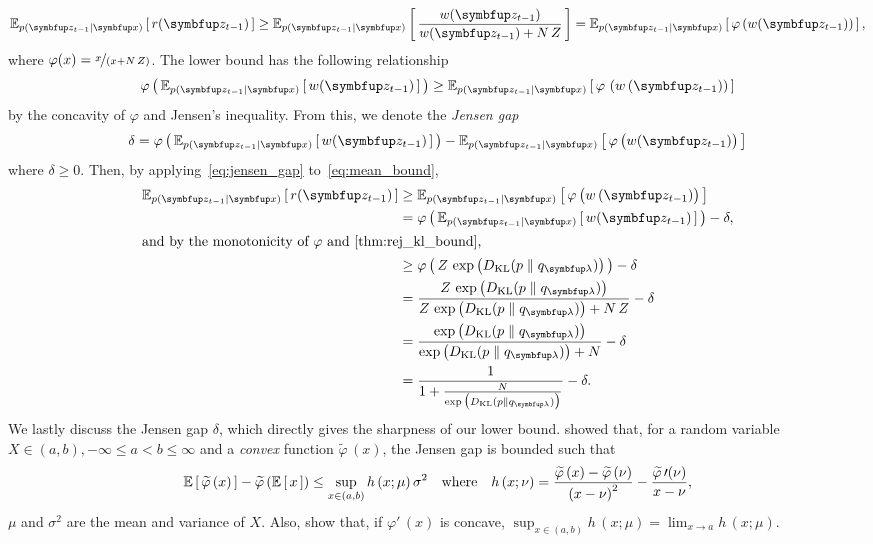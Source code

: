\begin{proofEnd}
\begin{equation}
    \Esub{p(\vz_{t-1}\mid\vx)}{ r(\vz_{t-1}) } \geq \Esub{p(\vz_{t-1}\mid\vx)}{ \frac{w(\vz_{t-1})}{w(\vz_{t-1}) + N\,Z}} =
    \Esub{p(\vz_{t-1}\mid\vx)}{ \varphi\left( w(\vz_{t-1}) \right)  },\label{eq:mean_bound}
  \end{equation}
  where \(\varphi(x) = \nicefrac{x}{(x + N\,Z)}\).
  The lower bound has the following relationship
  \begin{equation}
    \varphi\left(\,
    \Esub{p(\vz_{t-1}\mid\vx)}{ w(\vz_{t-1}) }
    \,\right)
    \geq
    \Esub{p(\vz_{t-1}\mid\vx)}{ \varphi\,\left( w\,(\vz_{t-1}) \right)  }
  \end{equation}
  by the concavity of \(\varphi\) and Jensen's inequality.
  From this, we denote the \textit{Jensen gap}
  \begin{equation}
    \delta = 
    \varphi\left(\,
    \Esub{p(\vz_{t-1}\mid\vx)}{ w(\vz_{t-1}) }
    \,\right)
    -
    \Esub{p(\vz_{t-1}\mid\vx)}{ \varphi\,\big( w(\vz_{t-1}) \big)  }\label{eq:jensen_gap}
  \end{equation}
  where \(\delta \geq 0\).
  Then, by applying~\eqref{eq:jensen_gap} to~\eqref{eq:mean_bound},
  \begin{align}
    \Esub{p(\vz_{t-1}\mid\vx)}{ r(\vz_{t-1}) }
    &\geq \Esub{p(\vz_{t-1}\mid\vx)}{ \varphi\,\big( w\,(\vz_{t-1}) \big)  } \\
    &= \varphi\left(\,
    \Esub{p(\vz_{t-1}\mid\vx)}{ w(\vz_{t-1}) }
    \,\right) - \delta, \\
\intertext{and by the monotonicity of \(\varphi\) and~\cref{thm:rej_kl_bound},}
    &\geq \varphi\left(\,
    Z\,\exp\big(\DKL{p}{q_{\vlambda}}\big)
    \,\right) - \delta \\
    &=
    \frac{
      Z\,\exp\big(\DKL{p}{q_{\vlambda}}\big)
    }{
      Z\,\exp\big(\DKL{p}{q_{\vlambda}}\big) + N\,Z
    } - \delta \\
    &= \frac{
      \exp\big(\DKL{p}{q_{\vlambda}}\big)
    }{
      \exp\big(\DKL{p}{q_{\vlambda}}\big) + N
    } - \delta \\
    &= \frac{1}{
       1 + \frac{N}{
         \exp\big(\DKL{p}{q_{\vlambda}}\big) 
      }
    } - \delta.
  \end{align}
  We lastly discuss the Jensen gap \(\delta\), which directly gives the sharpness of our lower bound.
  \citet[Theorem 1]{liao_sharpening_2019} showed that, for a random variable \(X \in (a, b), -\infty \leq a < b \leq \infty\) and a \textit{convex} function \(\widetilde{\varphi}\,(x)\), the Jensen gap is bounded such that
  \begin{align}
    \mathbb{E}\left[\,\widetilde{\varphi}\,(x)\,\right] - \widetilde{\varphi}\,(\mathbb{E}\left[\,x\,\right])
    \leq
    \sup_{x \in (a,b)} h\,(x; \mu) \, \sigma^2
    \quad \text{where}\quad h\,(x; \nu) = \frac{\widetilde{\varphi}\,(x) - \widetilde{\varphi}\,(\nu)}{{(x - \nu)}^2} - \frac{ \widetilde{\varphi}\,\prime(\nu) }{ x - \nu },\label{eq:jensen_gap_bound}
  \end{align}
\(\mu\) and \(\sigma^2\) are the mean and variance of \(X\).
Also, \citet[Lemma 1]{liao_sharpening_2019} show that, if \(\varphi\prime\,(x)\) is concave,  \(\sup_{x \in (a,b)} h\,(x; \mu) = \lim_{x \rightarrow a} h\,(x; \mu) \). 


\end{proofEnd}
